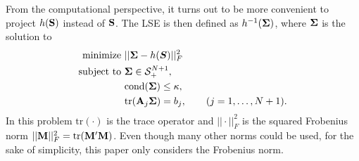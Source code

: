 \documentclass[11pt]{article}
\newcommand{\UNIT}{\text{UNIT}}
\newcommand{\SD}{\text{SD}}
\newcommand{\R}{\mathbb{R}}
\theoremstyle{definition}
\theoremstyle{definition}
\def\bSigma{{\bf \Sigma}}
\def\A{{\bf A}}
\def\M{{\bf M}}
\def\SS{{\bf S}}
\def\cond{\text{cond}}
\def\Tr{\text{tr}}
\begin{document}
From the computational perspective, it turns out to be more convenient to project $h(\SS)$ instead of $\SS$.  The LSE is then defined as $h^{-1}(\bSigma)$, where $\bSigma$ is the solution to
\begin{align}
 \label{lse_problem}
 \begin{split}
\text{minimize } &  || \bSigma - h(\boldsymbol{S}) ||_F^2\\
\text{subject to } & \bSigma \in \mathcal{S}_{+}^{N+1},\\
& \cond(\bSigma) \leq \kappa,\\
& \Tr(\A_j \bSigma) = b_j, \hspace{2em} (j = 1, \dots, N+1).
\end{split}
\end{align}
In this problem $\Tr(\cdot)$ is the trace operator and $||\cdot||_F^2$ is the squared Frobenius norm $||\M||_F^2 = \Tr(\M'\M)$. Even though many other norms could be used, for the sake of simplicity, this paper only considers the Frobenius norm. 
\end{document}
